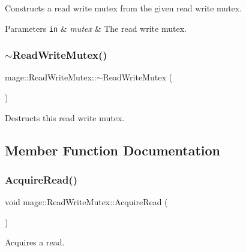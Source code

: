 Constructs a read write mutex from the given read write mutex.


\begin{DoxyParams}[1]{Parameters}
\mbox{\tt in}  & {\em mutex} & The read write mutex. \\
\hline
\end{DoxyParams}
\hypertarget{classmage_1_1_read_write_mutex_a73676d9414658d63edfe443ee1d55c8b}{}\label{classmage_1_1_read_write_mutex_a73676d9414658d63edfe443ee1d55c8b} 
\subsubsection{\texorpdfstring{$\sim$\+Read\+Write\+Mutex()}{~ReadWriteMutex()}}
{\footnotesize\ttfamily mage\+::\+Read\+Write\+Mutex\+::$\sim$\+Read\+Write\+Mutex (\begin{DoxyParamCaption}{ }\end{DoxyParamCaption})\hspace{0.3cm}{\ttfamily [private]}}

Destructs this read write mutex. 

\subsection{Member Function Documentation}
\hypertarget{classmage_1_1_read_write_mutex_af78045647078aaf3966c8f1b06e35c92}{}\label{classmage_1_1_read_write_mutex_af78045647078aaf3966c8f1b06e35c92} 
\subsubsection{\texorpdfstring{Acquire\+Read()}{AcquireRead()}}
{\footnotesize\ttfamily void mage\+::\+Read\+Write\+Mutex\+::\+Acquire\+Read (\begin{DoxyParamCaption}{ }\end{DoxyParamCaption})\hspace{0.3cm}{\ttfamily [private]}}

Acquires a read. \hypertarget{classmage_1_1_read_write_mutex_a76137013107a9c2c1fc05c1e0747965e}{}\label{classmage_1_1_read_write_mutex_a76137013107a9c2c1fc05c1e0747965e} 
